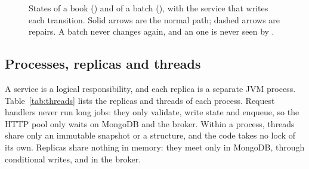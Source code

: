 \begin{figure}[ht]
\caption{States of a book () and of a batch (), with the service
that writes each transition. Solid arrows are the normal path; dashed arrows are repairs. A  batch never
changes again, and an  one is never seen by .}
\label{fig:lifecycle}
\end{figure}

\subsection{Processes, replicas and threads}
\label{sec:threads}

A service is a logical responsibility, and each replica is a separate JVM process. Table~\ref{tab:threads} lists the
replicas and threads of each process. Request handlers never run long jobs: they only validate, write state and
enqueue, so the HTTP pool only waits on MongoDB and the broker. Within a process, threads share only an immutable
snapshot or a  structure, and the code takes no lock of its own. Replicas share nothing in
memory: they meet only in MongoDB, through conditional writes, and in the broker.

